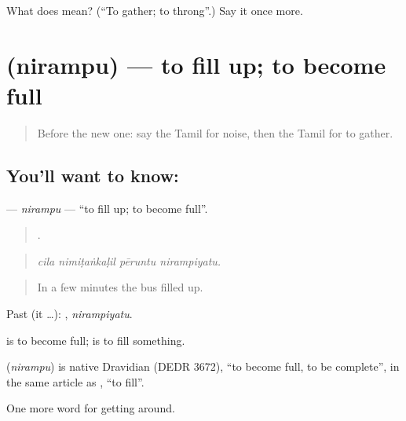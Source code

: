 \begin{tcolorbox}[breakable,colback=teal!4,colframe=teal!35!black,title={Before you move on}]
What does  mean? (\textquotedblleft{}To gather; to throng\textquotedblright{}.) Say it once more.
\end{tcolorbox}
\section[\texorpdfstring{\ta{நிரம்பு} (nirampu)}{நிரம்பு (nirampu)}]{ (nirampu) — to fill up; to become full}

\label{lesson:TA-C426-nirampu}



\begin{quote}
Before the new one: say the Tamil for noise, then the Tamil for to gather.
\end{quote}

\subsection*{You'll want to know: }
\textbf{} — \emph{nirampu} — \textquotedblleft{}to fill up; to become full\textquotedblright{}.

\begin{quote}
   .
\end{quote}

\begin{quote}
\emph{cila nimiṭaṅkaḷil pēruntu nirampiyatu.}
\end{quote}

\begin{quote}
In a few minutes the bus filled up.
\end{quote}

Past (it …): , \emph{nirampiyatu}.

 is to become full;  is to fill something.

\begin{cousinweb}
\textbf{} (\emph{nirampu}) is native Dravidian (DEDR 3672), \textquotedblleft{}to become full, to be complete\textquotedblright{}, in the same article as , \textquotedblleft{}to fill\textquotedblright{}.
\end{cousinweb}

\begin{grammarlens}[title={What you've built}]
One more word for getting around.
\end{grammarlens}

